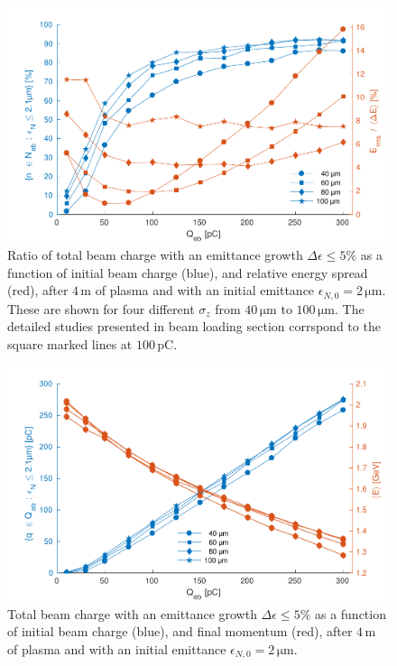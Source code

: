 \documentclass[aps,prstab,reprint,amsmath,amssymb,groupedaddress]{revtex4-1}
\newcommand{\unit}[1]{\,\mathrm{#1}}
\begin{document}
\begin{figure}[hbt]
    \includegraphics[width=\linewidth,trim={2mm 0mm 2mm 0mm},clip]{figures/beamQuality}
    \caption{\label{Fig:BeamQ} Ratio of total beam charge with an emittance growth $\Delta\epsilon \leq 5\%$ as a
        function of initial beam charge (blue), and relative energy spread (red), after $4\unit{m}$ of plasma and with
        an initial emittance $\epsilon_{N,0}=2\unit{\mu m}$. These are shown for four different $\sigma_{z}$ from
        $40\unit{\mu m}$ to $100\unit{\mu m}$. The detailed studies presented in beam loading section corrspond to the
        square marked lines at $100\unit{pC}$.}
\end{figure}

\begin{figure}[hbt]
    \includegraphics[width=\linewidth,trim={2mm 0mm 2mm 0mm},clip]{figures/beamQualityAbs}
    \caption{\label{Fig:BeamQAbs} Total beam charge with an emittance growth $\Delta\epsilon \leq 5\%$ as a function of
        initial beam charge (blue), and final momentum (red), after $4\unit{m}$ of plasma and with an initial emittance
        $\epsilon_{N,0}=2\unit{\mu m}$.}
\end{figure}
\end{document}
